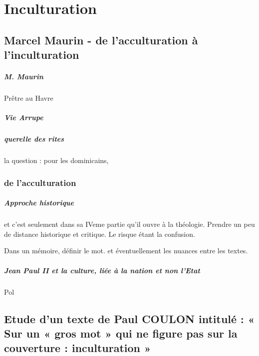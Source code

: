 \chapter{Inculturation}


\section{Marcel Maurin - de l'acculturation à l'inculturation}

\paragraph{M. Maurin} Prêtre au Havre

\paragraph{Vie Arrupe}


\paragraph{querelle des rites} la question : pour les dominicains, 

\subsection{de l'acculturation}

\paragraph{Approche historique} et c'est seulement dans sa IVeme partie qu'il ouvre à la théologie. Prendre un peu de distance historique et critique. Le risque étant la confusion. 

\begin{Prop}
    Dans un mémoire, définir le mot. et éventuellement les nuances entre les textes. 
\end{Prop}

\paragraph{Jean Paul II et la culture, liée à la nation et non l'Etat} Pol



\section{Etude d’un texte de Paul COULON intitulé : « Sur un « gros mot » qui ne figure pas sur la couverture : inculturation » }



